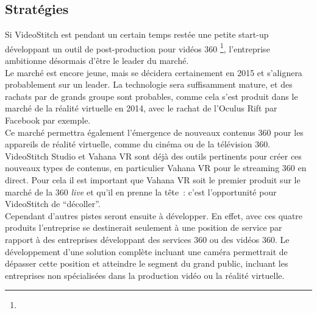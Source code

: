\subsection{Stratégies}
Si VideoStitch est pendant un certain temps restée une petite start-up développant
un outil de post-production pour vidéos 360 \footnote{}, 
l'entreprise ambitionne désormais d'être le leader du marché.\\
Le marché est encore jeune, mais se décidera certainement en 2015 et s'alignera
probablement sur un leader. La technologie sera suffisamment mature, et des rachats
par de grands groupe sont probables, comme cela s'est produit dans le marché de la
réalité virtuelle en 2014, avec le rachat de l'Oculus Rift par Facebook 
\cite{facebook-vr} par exemple.\\
Ce marché permettra également l'émergence de nouveaux contenus 360 pour les appareils
de réalité virtuelle, comme du cinéma ou de la télévision 360.
VideoStitch Studio et Vahana VR sont déjà des outils pertinents pour créer ces 
nouveaux types de contenus, en particulier Vahana VR pour le streaming 360 en direct.
Pour cela il est important que Vahana VR soit le premier produit sur le marché
de la 360 \textit{live} et qu'il en prenne la tête~: c'est l'opportunité pour VideoStitch
de \enquote{décoller}.\\
\newline
Cependant d'autres pistes seront ensuite à développer. En effet, avec ces quatre produits
l'entreprise se destinerait seulement à une position de service par rapport à des 
entreprises développant des services 360 ou des vidéos 360. Le développement d'une solution complète incluant une 
caméra permettrait de dépasser cette position et atteindre le segment du grand public, incluant
les entreprises non spécialisées dans la production vidéo ou la réalité virtuelle.

